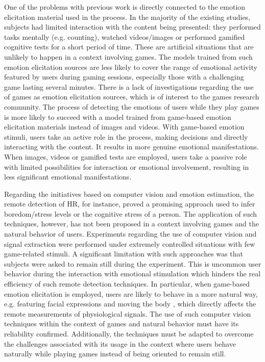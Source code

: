 One of the problems with previous work is directly connected to the emotion elicitation material used in the process. In the majority of the existing studies, subjects had limited interaction with the content being presented: they performed tasks mentally (e.g. counting), watched videos/images or performed gamified cognitive tests for a short period of time. These are artificial situations that are unlikely to happen in a context involving games. The models trained from such emotion elicitation sources are less likely to cover the range of emotional activity featured by users during gaming sessions, especially those with a challenging game lasting several minutes. There is a lack of investigations regarding the use of games as emotion elicitation sources, which is of interest to the games research community. The process of detecting the emotions of users while they play games is more likely to succeed with a model trained from game-based emotion elicitation materials instead of images and videos. With game-based emotion stimuli, users take an active role in the process, making decisions and directly interacting with the content. It results in more genuine emotional manifestations. When images, videos or gamified tests are employed, users take a passive role with limited possibilities for interaction or emotional involvement, resulting in less significant emotional manifestations.

Regarding the initiatives based on computer vision and emotion estimation, the remote detection of HR, for instance, proved a promising approach used to infer boredom/stress levels \parencite{kukolja2014comparative} or the cognitive stress \parencite{mcduff2014remote} of a person. The application of such techniques, however, has not been proposed in a context involving games and the natural behavior of users. Experiments regarding the use of computer vision and signal extraction were performed under extremely controlled situations with few game-related stimuli. A significant limitation with such approaches was that subjects were asked to remain still during the experiment. This is uncommon user behavior during the interaction with emotional stimulation which hinders the real efficiency of such remote detection techniques. In particular, when game-based emotion elicitation is employed, users are likely to behave in a more natural way, e.g. featuring facial expressions and moving the body \parencite{bevilacqua2016variations}, which directly affects the remote measurements of physiological signals. The use of such computer vision techniques within the context of games and natural behavior must have its reliability confirmed. Additionally, the techniques must be adapted to overcome the challenges associated with its usage in the context where users behave naturally while playing games instead of being oriented to remain still.

